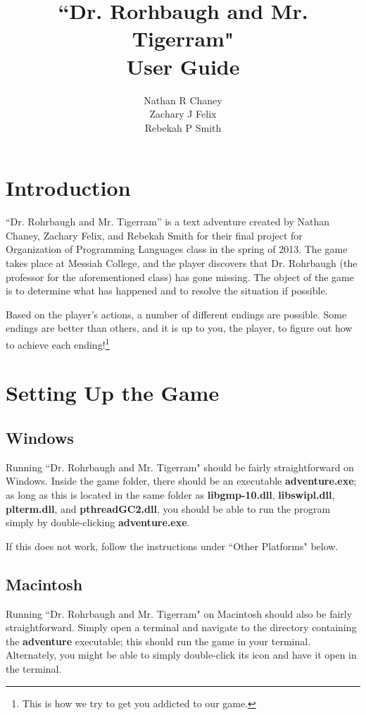 \documentclass{report}
\begin{document}
\title{``Dr. Rorhbaugh and Mr. Tigerram" \\ User Guide}
\author{Nathan R Chaney \\ Zachary J Felix \\ Rebekah P Smith}
\maketitle

\tableofcontents

\chapter{Introduction}
``Dr. Rohrbaugh and Mr. Tigerram'' is a text adventure created by Nathan Chaney, Zachary Felix, and Rebekah Smith for their final project for Organization of Programming Languages class in the spring of 2013.  The game takes place at Messiah College, and the player discovers that Dr. Rohrbaugh (the professor for the aforementioned class) has gone missing. The object of the game is to determine what has happened and to resolve the situation if possible.

Based on the player's actions, a number of different endings are possible. Some endings are better than others, and it is up to you, the player, to figure out how to achieve each ending!\footnote{This is how we try to get you addicted to our game.}

\chapter{Setting Up the Game}
\section{Windows}
Running ``Dr. Rohrbaugh and Mr. Tigerram" should be fairly straightforward on Windows. Inside the game folder, there should be an executable {\bf adventure.exe}; as long as this is located in the same folder as {\bf libgmp-10.dll}, {\bf libswipl.dll}, {\bf plterm.dll}, and {\bf pthreadGC2.dll}, you should be able to run the program simply by double-clicking {\bf adventure.exe}.

If this does not work, follow the instructions under ``Other Platforms" below.

\section{Macintosh}
Running ``Dr. Rohrbaugh and Mr. Tigerram" on Macintosh should also be fairly straightforward. Simply open a terminal and navigate to the directory containing the {\bf adventure} executable; this should run the game in your terminal.  Alternately, you might be able to simply double-click its icon and have it open in the terminal.
\end{document}
